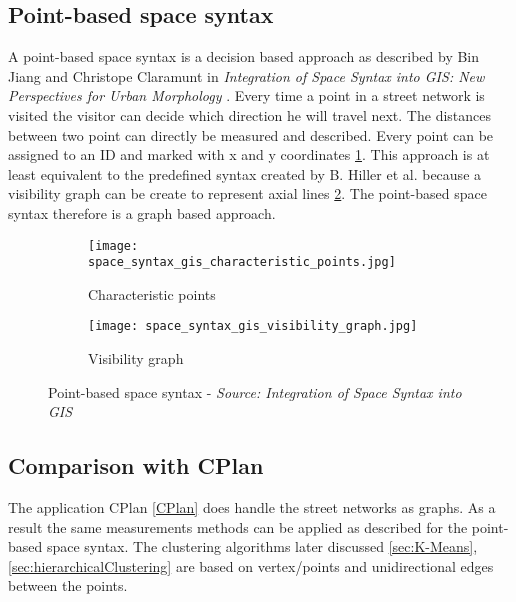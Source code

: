 \subsection{Point-based space syntax}
A point-based space syntax is a decision based approach as described by Bin Jiang and Christope Claramunt in \textit{Integration of Space Syntax into GIS: New Perspectives for Urban Morphology} \citep{integrationSpaceSyntaxGIS:2002}. Every time a point in a street network is visited the visitor can decide which direction he will travel next. The distances between two point can directly be measured and described. Every point can be assigned to an ID and marked with x and y coordinates \ref{fig:space_syntax_gis_characteristic_points}. This approach is at least equivalent to the predefined syntax created by B. Hiller et al.\citep{spaceSyntax:1976} because a visibility graph can be create to represent axial lines \ref{fig:space_syntax_gis_visibility_graph}. The point-based space syntax therefore is a graph based approach.

\begin{figure}[ht]
    \centering
    \begin{subfigure}[b]{0.4\textwidth}
        \texttt{[image: space\_syntax\_gis\_characteristic\_points.jpg]}
        \caption{Characteristic points}
        \label{fig:space_syntax_gis_characteristic_points}
    \end{subfigure}
    \quad
    \begin{subfigure}[b]{0.4\textwidth}
        \texttt{[image: space\_syntax\_gis\_visibility\_graph.jpg]}
        \caption{Visibility graph}
        \label{fig:space_syntax_gis_visibility_graph}
    \end{subfigure}
    \caption{Point-based space syntax - \textit{Source: Integration of Space Syntax into GIS \citep{integrationSpaceSyntaxGIS:2002}}}
    \label{fig:space_syntax_gis}
\end{figure}

\subsection{Comparison with CPlan}
The application CPlan \ref{CPlan} does handle the street networks as graphs. As a result the same measurements methods can be applied as described for the point-based space syntax. The clustering algorithms later discussed \ref{sec:K-Means}, \ref{sec:hierarchicalClustering} are based on vertex/points and unidirectional edges between the points.